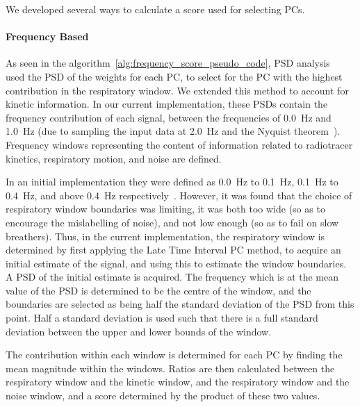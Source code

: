             We developed several ways to calculate a score used for selecting \glspl{PC}.
            
            \paragraph{Frequency Based} \label{sec:frequency_based}
                As seen in the algorithm~\ref{alg:frequency_score_pseudo_code}, \gls{PSD} analysis~\parencite{Thielemans2011} used the \gls{PSD} of the weights for each \gls{PC}, to select for the \gls{PC} with the highest contribution in the respiratory window. We extended this method to account for kinetic information. In our current implementation, these \glspl{PSD} contain the frequency contribution of each signal, between the frequencies of \SI{0.0}{\hertz} and \SI{1.0}{\hertz} (due to sampling the input data at \SI{2.0}{\hertz} and the Nyquist theorem~\parencite{Whittaker1915OnInterpolation-Theory, Nyquist1928CertainTheory, Shannon1949CommunicationNoise}). Frequency windows representing the content of information related to radiotracer kinetics, respiratory motion, and noise are defined.
                
                In an initial implementation they were defined as \SI{0.0}{\hertz} to \SI{0.1}{\hertz}, \SI{0.1}{\hertz} to \SI{0.4}{\hertz}, and above \SI{0.4}{\hertz} respectively~\parencite{Bertolli2017}. However, it was found that the choice of respiratory window boundaries was limiting, it was both too wide (so as to encourage the mislabelling of noise), and not low enough (so as to fail on slow breathers). Thus, in the current implementation, the respiratory window is determined by first applying the Late Time Interval \gls{PC} method, to acquire an initial estimate of the signal, and using this to estimate the window boundaries. A \gls{PSD} of the initial estimate is acquired. The frequency which is at the mean value of the \gls{PSD} is determined to be the centre of the window, and the boundaries are selected as being half the standard deviation of the \gls{PSD} from this point. Half a standard deviation is used such that there is a full standard deviation between the upper and lower bounds of the window.
                
                The contribution within each window is determined for each \gls{PC} by finding the mean magnitude within the windows. Ratios are then calculated between the respiratory window and the kinetic window, and the respiratory window and the noise window, and a score determined by the product of these two values.
                    
